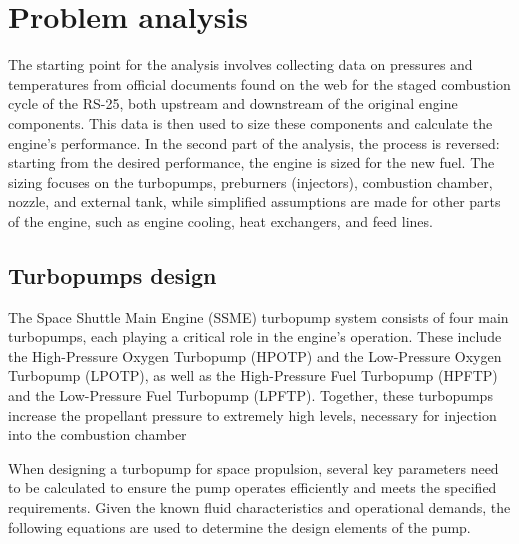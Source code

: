 \section{Problem analysis}
The starting point for the analysis involves collecting data on pressures and temperatures from official documents found on the web for the staged combustion cycle of the RS-25, both upstream and downstream of the original engine components. 
This data is then used to size these components and calculate the engine's performance. 
In the second part of the analysis, the process is reversed: starting from the desired performance, the engine is sized for the new fuel. 
The sizing focuses on the turbopumps, preburners (injectors), combustion chamber, nozzle, and external tank, while simplified assumptions are made for other parts of the engine, such as engine cooling, heat exchangers, and feed lines.

\subsection{Turbopumps design}
The Space Shuttle Main Engine (SSME) turbopump system consists of four main turbopumps, each playing a critical role in the engine's operation. These include the High-Pressure Oxygen Turbopump (HPOTP) and the Low-Pressure Oxygen Turbopump (LPOTP), as well as the High-Pressure Fuel Turbopump (HPFTP) and the Low-Pressure Fuel Turbopump (LPFTP). Together, these turbopumps increase the propellant pressure to extremely high levels, necessary for injection into the combustion chamber

When designing a turbopump for space propulsion, several key parameters need to be calculated to ensure the pump operates efficiently and meets the specified requirements. Given the known fluid characteristics and operational demands, the following equations are used to determine the design elements of the pump.


